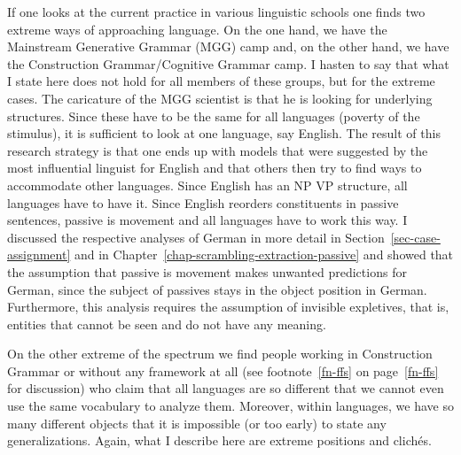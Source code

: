 If one looks at the current practice in various linguistic schools one finds two extreme ways of
approaching language. On the one hand, we have the Mainstream Generative Grammar (MGG) camp and, on the
other hand, we have the Construction Grammar/Cognitive Grammar camp. I hasten to say that what I state
here does not hold for all members of these groups, but for the extreme cases. The caricature of the
MGG scientist is that he is looking for underlying structures. Since these have to be the same for
all languages (poverty of the stimulus), it is sufficient to look at one language, say English. The
result of this research strategy is that one ends up with models that were suggested by the most
influential linguist for English and that others then try to find ways to accommodate other
languages. Since English has an NP VP structure, all languages have to have it. Since English reorders
constituents in passive sentences, passive is movement and all languages have to work this way. I
discussed the respective analyses of German in more detail in Section~\ref{sec-case-assignment}
and in Chapter~\ref{chap-scrambling-extraction-passive} and showed that the assumption that passive is movement
makes unwanted predictions for German, since the subject of passives stays in the object
position in German. Furthermore, this analysis requires the assumption of invisible expletives, that is,
entities that cannot be seen and do not have any meaning.

On the other extreme of the spectrum we find people working in Construction Grammar or without any
framework at all (see footnote~\ref{fn-ffs} on page~\ref{fn-ffs} for discussion) who claim that all languages are so different that we cannot even use the same
vocabulary to analyze them. Moreover, within languages, we have so many different objects that it is impossible (or too early) to state any
generalizations. Again, what I describe here are extreme positions and clichés.

